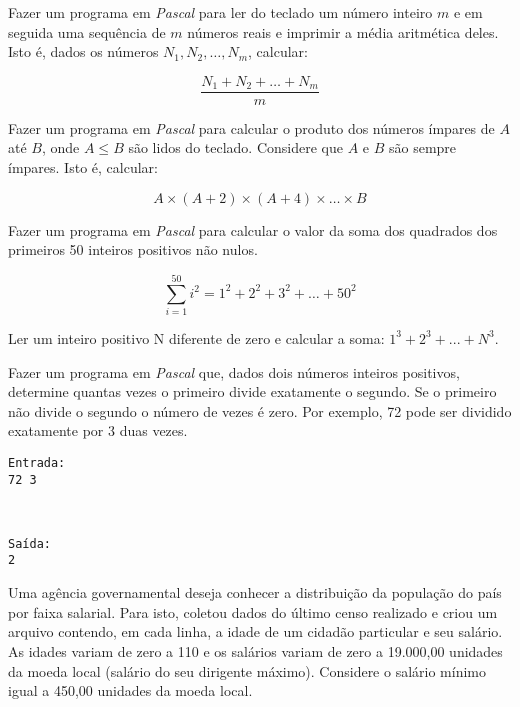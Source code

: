 
\item Fazer um programa em \emph{Pascal} para ler do teclado
um número inteiro $m$ e em seguida
uma sequência de $m$ números reais e imprimir a média aritmética deles.
Isto é, dados os números $N_1, N_2, \ldots, N_m$, calcular:

\[
\frac{N_1 + N_2 + \ldots + N_m}{m}
\]

\item Fazer um programa em \emph{Pascal} para calcular
o produto dos números ímpares de $A$ até $B$,
onde $A \le B$ são lidos do teclado. Considere que $A$ e $B$ são
sempre ímpares. Isto é, calcular:

\[
A \times (A+2) \times (A+4) \times \ldots \times B
\]

\item Fazer um programa em \emph{Pascal} para
     calcular o  valor da  soma dos  quadrados dos  primeiros  50 inteiros
     positivos não nulos.

\[
\sum_{i=1}^{50}{i^2} = 1^2 + 2^2 + 3^2 + \ldots + 50^2
\]

\item Ler um inteiro positivo N diferente de zero e calcular a soma:
   $1^{3} + 2^{3} + ... + N^{3}$.

\item Fazer um programa em \emph{Pascal} que,
    dados dois números inteiros positivos, determine quantas vezes o
    primeiro  divide exatamente  o segundo.  Se o  primeiro não  divide o
    segundo o número de vezes é zero. Por exemplo, 72 pode ser dividido
    exatamente por 3 duas vezes.

\begin{minipage}{5cm}
\begin{verbatim}
Entrada:
72 3
\end{verbatim}
\end{minipage} \
\begin{minipage}{5cm}
\begin{verbatim}
Saída:
2
\end{verbatim}
\end{minipage}

\item
Uma agência governamental deseja conhecer a distribuição da população do
país por faixa salarial. Para isto, coletou dados do
último censo realizado e criou um arquivo contendo, em cada linha, a
idade de um cidadão particular e seu salário. As idades variam de zero a
110 e os salários variam de zero a 19.000,00 unidades da moeda local
(salário do seu dirigente máximo). Considere o salário mínimo igual a 450,00 unidades da moeda local.

